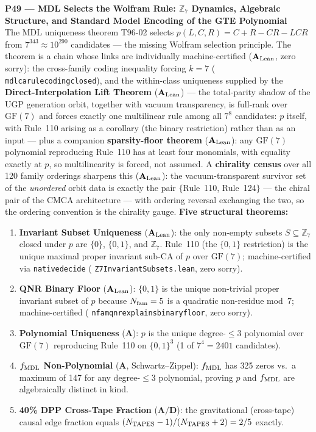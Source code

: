 \documentclass[11pt]{article}
\newcommand{\lean}[1]{%
  \penalty-100
  \begingroup\def\_{{\textunderscore\allowbreak}}\texttt{#1}\endgroup}
\newcommand{\CatAL}{\ensuremath{\textbf{A}_{\rm Lean}}}
\newcommand{\CatAD}{\textbf{A/D}}
\newcommand{\CatA}{\textbf{A}}
\begin{document}
\medskip
\noindent\textbf{P49 — MDL Selects the Wolfram Rule: $\mathbb{Z}_7$ Dynamics, Algebraic Structure, and Standard Model Encoding of the GTE Polynomial}~\cite{SpivackGTEPolynomialWolfram}\\
The MDL uniqueness theorem T96-02 selects $p(L,C,R) = C+R-CR-LCR$ from
$7^{343} \approx 10^{290}$ candidates --- the missing Wolfram selection principle.
The theorem is a chain whose links are individually machine-certified ($\CatAL$,
zero sorry): the cross-family coding inequality forcing $k=7$
(\lean{mdl\_ca\_rule\_coding\_closed}), and the within-class uniqueness supplied
by the \textbf{Direct-Interpolation Lift Theorem} ($\CatAL$) --- the total-parity
shadow of the UGP generation orbit, together with vacuum transparency, is
full-rank over $\mathrm{GF}(7)$ and forces exactly one multilinear rule among all
$7^8$ candidates: $p$ itself, with Rule~110 arising as a corollary (the binary
restriction) rather than as an input --- plus a companion \textbf{sparsity-floor
theorem} ($\CatAL$): any $\mathrm{GF}(7)$ polynomial reproducing Rule~110 has at
least four monomials, with equality exactly at $p$, so multilinearity is forced,
not assumed.  A \textbf{chirality census} over all 120 family orderings sharpens
this ($\CatAL$): the vacuum-transparent survivor set of the \emph{unordered}
orbit data is exactly the pair $\{$Rule~110, Rule~124$\}$ --- the chiral pair of
the CMCA architecture --- with ordering reversal exchanging the two, so the
ordering convention is the chirality gauge.
\textbf{Five structural theorems:}
\begin{enumerate}[noitemsep,topsep=2pt]
  \item \textbf{Invariant Subset Uniqueness} ($\CatAL$): the only non-empty subsets
    $S \subseteq \mathbb{Z}_7$ closed under $p$ are $\{0\}$, $\{0,1\}$, and $\mathbb{Z}_7$.
    Rule~110 (the $\{0,1\}$ restriction) is the unique maximal proper invariant sub-CA of $p$
    over $\mathrm{GF}(7)$; machine-certified via \lean{native\_decide}
    (\lean{Z7InvariantSubsets.lean}, zero sorry).
  \item \textbf{QNR Binary Floor} ($\CatAL$): $\{0,1\}$ is the unique non-trivial proper
    invariant subset of $p$ because $N_{\rm fam}=5$ is a quadratic non-residue mod~$7$;
    machine-certified (\lean{nfam\_qnr\_explains\_binary\_floor}, zero sorry).
  \item \textbf{Polynomial Uniqueness} ($\CatA$): $p$ is the unique degree-$\leq 3$
    polynomial over $\mathrm{GF}(7)$ reproducing Rule~110 on $\{0,1\}^3$ (1 of $7^4=2401$ candidates).
  \item \textbf{$f_{\rm MDL}$ Non-Polynomial} ($\CatA$, Schwartz--Zippel): $f_{\rm MDL}$ has
    325 zeros vs.\ a maximum of 147 for any degree-$\leq 3$ polynomial, proving $p$ and
    $f_{\rm MDL}$ are algebraically distinct in kind.
  \item \textbf{40\% DPP Cross-Tape Fraction} ($\CatAD$): the gravitational (cross-tape)
    causal edge fraction equals $(N_{\rm TAPES}-1)/(N_{\rm TAPES}+2) = 2/5$ exactly.
\end{enumerate}
\end{document}
